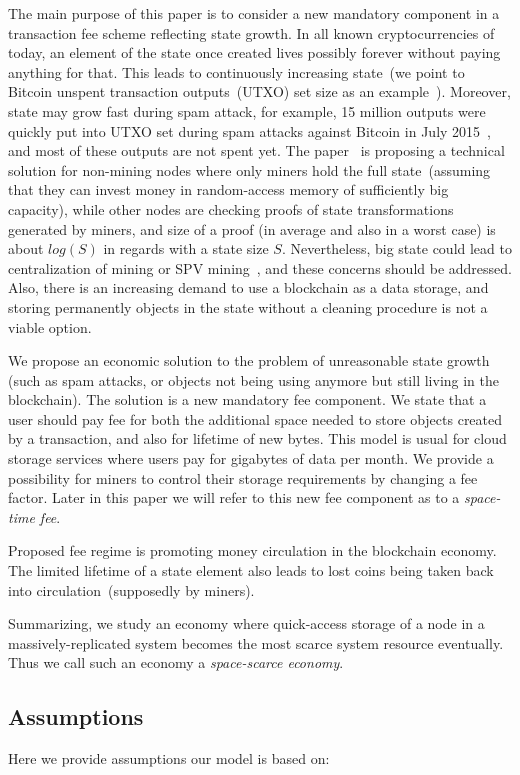\documentclass[]{llncs}   %
\begin{document}
The main purpose of this paper is to consider a new mandatory component in a transaction fee scheme reflecting state growth. In all known cryptocurrencies of today, an element of the state once created lives possibly forever without paying anything for that. This leads to continuously increasing state~(we point to Bitcoin unspent transaction outputs~(UTXO) set size as an example~\cite{utxoChart}). Moreover, state may grow fast during spam attack, for example, 15 million outputs were quickly put into UTXO set during spam attacks against Bitcoin in July 2015~\cite{bitcoin2015flood}, and most of these outputs are not spent yet. The paper~\cite{reyzin2016improving} is proposing a technical solution for non-mining nodes where only miners hold the full state~(assuming that they can invest money in  random-access memory of sufficiently big capacity), while other nodes are checking proofs of state transformations generated by miners, and size of a proof (in average and also in a worst case) is about $log(S)$ in regards with a state size $S$. Nevertheless, big state could lead to centralization of mining or SPV mining~\cite{spvMining}, and these concerns should be addressed. Also, there is an increasing demand to use a blockchain as a data storage, and storing permanently objects in the state without a cleaning procedure is not a viable option.

We propose an economic solution to the problem of unreasonable state growth (such as spam attacks, or objects not being using anymore but still living in the blockchain). The solution is a new mandatory fee component. We state that a user should pay fee for both the additional space needed to store objects created by a transaction, and also for lifetime of new bytes. This model is usual for cloud storage services where users pay for gigabytes of data per month. We provide a possibility for miners to control their storage requirements by changing a fee factor. Later in this paper we will refer to this new fee component as to a {\em space-time fee}.

Proposed fee regime is promoting money circulation in the blockchain economy. The limited lifetime of a state element also leads to lost coins being taken back into circulation~(supposedly by miners). 

Summarizing, we study an economy where quick-access storage of a node in a massively-replicated system becomes the most scarce system resource eventually. Thus we call such an economy a {\em space-scarce economy}.

\subsection{Assumptions}
Here we provide assumptions our model is based on:
\end{document}
